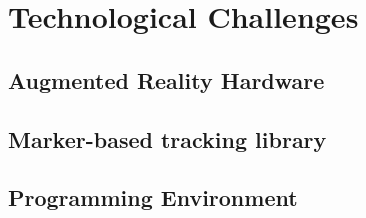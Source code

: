 \section{Technological Challenges} \label{sec:technologicalchallenges}
	
	\subsection{Augmented Reality Hardware} \label{ssec:arhardware}
	
	\subsection{Marker-based tracking library} \label{ssec:trackinglib}
	
	\subsection{Programming Environment} \label{ssec:programmingenvironment}
	
